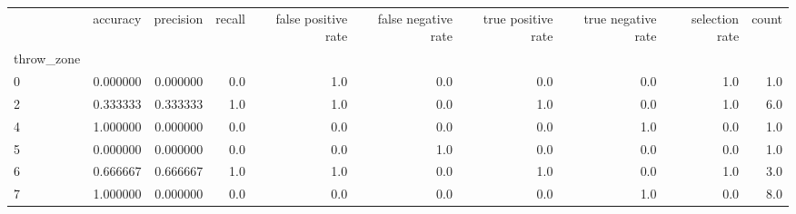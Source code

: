 \begin{tabular}{lrrrrrrrrr}
\toprule
{} &  accuracy &  precision &  recall &  false positive rate &  false negative rate &  true positive rate &  true negative rate &  selection rate &  count \\
throw\_zone &           &            &         &                      &                      &                     &                     &                 &        \\
\midrule
0          &  0.000000 &   0.000000 &     0.0 &                  1.0 &                  0.0 &                 0.0 &                 0.0 &             1.0 &    1.0 \\
2          &  0.333333 &   0.333333 &     1.0 &                  1.0 &                  0.0 &                 1.0 &                 0.0 &             1.0 &    6.0 \\
4          &  1.000000 &   0.000000 &     0.0 &                  0.0 &                  0.0 &                 0.0 &                 1.0 &             0.0 &    1.0 \\
5          &  0.000000 &   0.000000 &     0.0 &                  0.0 &                  1.0 &                 0.0 &                 0.0 &             0.0 &    1.0 \\
6          &  0.666667 &   0.666667 &     1.0 &                  1.0 &                  0.0 &                 1.0 &                 0.0 &             1.0 &    3.0 \\
7          &  1.000000 &   0.000000 &     0.0 &                  0.0 &                  0.0 &                 0.0 &                 1.0 &             0.0 &    8.0 \\
\bottomrule
\end{tabular}
